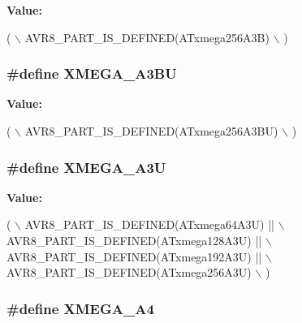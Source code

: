 {\bfseries Value\-:}
\begin{DoxyCode}
( \(\backslash\)
        AVR8\_PART\_IS\_DEFINED(ATxmega256A3B) \(\backslash\)
        )
\end{DoxyCode}
\hypertarget{group__xmega__part__macros__group_ga98083f3307fe61cc2377948db87cd708}{
\subsubsection[{X\-M\-E\-G\-A\-\_\-\-A3\-B\-U}]{\setlength{\rightskip}{0pt plus 5cm}\#define X\-M\-E\-G\-A\-\_\-\-A3\-B\-U}}\label{group__xmega__part__macros__group_ga98083f3307fe61cc2377948db87cd708}
{\bfseries Value\-:}
\begin{DoxyCode}
( \(\backslash\)
        AVR8\_PART\_IS\_DEFINED(ATxmega256A3BU) \(\backslash\)
        )
\end{DoxyCode}
\hypertarget{group__xmega__part__macros__group_gab5232598231cc5c17658e4b7cc5293ec}{
\subsubsection[{X\-M\-E\-G\-A\-\_\-\-A3\-U}]{\setlength{\rightskip}{0pt plus 5cm}\#define X\-M\-E\-G\-A\-\_\-\-A3\-U}}\label{group__xmega__part__macros__group_gab5232598231cc5c17658e4b7cc5293ec}
{\bfseries Value\-:}
\begin{DoxyCode}
( \(\backslash\)
        AVR8\_PART\_IS\_DEFINED(ATxmega64A3U)  || \(\backslash\)
        AVR8\_PART\_IS\_DEFINED(ATxmega128A3U) || \(\backslash\)
        AVR8\_PART\_IS\_DEFINED(ATxmega192A3U) || \(\backslash\)
        AVR8\_PART\_IS\_DEFINED(ATxmega256A3U) \(\backslash\)
        )
\end{DoxyCode}
\hypertarget{group__xmega__part__macros__group_ga7b83a133489c9896dbdc730615c83be8}{
\subsubsection[{X\-M\-E\-G\-A\-\_\-\-A4}]{\setlength{\rightskip}{0pt plus 5cm}\#define X\-M\-E\-G\-A\-\_\-\-A4}}\label{group__xmega__part__macros__group_ga7b83a133489c9896dbdc730615c83be8}
